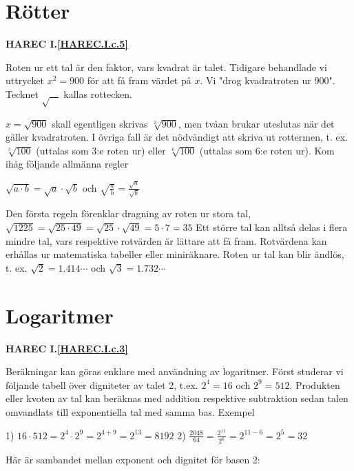 \section{Rötter}
\textbf{HAREC I.\ref{HAREC.I.c.5}\label{myHAREC.I.c.5}}

Roten ur ett tal är den faktor, vars kvadrat är talet.
Tidigare behandlade vi uttrycket $x^2 = 900$ för att få fram värdet på $x$. Vi
"drog kvadratroten ur 900".
Tecknet $\sqrt{\ \ \ \ }$ kallas rottecken.

$x = \sqrt{900}$ skall egentligen skrivas $\sqrt[2]{900}$,
men tvåan brukar uteslutas när det gäller kvadratroten. I övriga fall är det
nödvändigt att skriva ut rottermen, t. ex. $\sqrt[3]{100}$ (uttalas
som 3:e roten ur) eller $\sqrt[6]{100}$ (uttalas som 6:e roten ur).
Kom ihåg följande allmänna regler

$\sqrt{a \cdot b} = \sqrt{a} \cdot \sqrt{b}$ och
$\sqrt{\frac{a}{b}} = \frac{\sqrt{a}}{\sqrt{b}}$

Den första regeln förenklar dragning av roten ur stora tal,
$\sqrt{1225} = \sqrt{25 \cdot 49} = \sqrt{25} \cdot \sqrt{49} = 5 \cdot 7 = 35$
Ett större tal kan alltså delas i flera mindre tal, vars respektive rotvärden är
lättare att få fram. Rotvärdena kan erhållas ur matematiska tabeller eller
miniräknare.
Roten ur tal kan blir ändlös, t. ex.
$\sqrt{2} = 1.414\cdots$ och $\sqrt{3} = 1.732\cdots$

\section{Logaritmer}
\textbf{HAREC I.\ref{HAREC.I.c.3}\label{myHAREC.I.c.3}}

Beräkningar kan göras enklare med användning av logaritmer.
Först studerar vi följande tabell över digniteter av talet 2,
t.ex. $2^4 = 16$ och $2^9 = 512$.
Produkten eller kvoten av tal kan beräknas med addition respektive subtraktion
sedan talen omvandlats till exponentiella tal med samma bas.
Exempel

1) $16 \cdot 512 = 2^4 \cdot 2^9 =2^{4+9} = 2^{13} = 8192$
2) $\frac{2048}{64} = \frac{2^{11}}{2^6} =2^{11-6} =2^5 = 32$

Här är sambandet mellan exponent och dignitet för basen 2:


